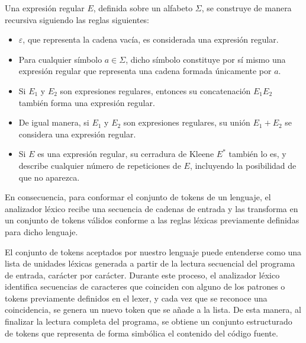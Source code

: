 \documentclass[a4paper,12pt]{article}
\begin{document}
\begin{tcolorbox}[title=Definición: Expresiones regulares]

Una expresión regular $E$, definida sobre un alfabeto $\Sigma$, se construye de manera recursiva siguiendo las reglas siguientes:

\begin{itemize}
    \item $\varepsilon$, que representa la cadena vacía, es considerada una expresión regular.
    
    \item Para cualquier símbolo $a \in \Sigma$, dicho símbolo constituye por sí mismo una expresión regular que representa una cadena formada únicamente por $a$.
    
    \item Si $E_1$ y $E_2$ son expresiones regulares, entonces su concatenación $E_1E_2$ también forma una expresión regular.
    
    \item De igual manera, si $E_1$ y $E_2$ son expresiones regulares, su unión $E_1 + E_2$ se considera una expresión regular.
    
    \item Si $E$ es una expresión regular, su cerradura de Kleene $E^{*}$ también lo es, y describe cualquier número de repeticiones de $E$, incluyendo la posibilidad de que no aparezca.\cite{UNAMTesis,LDPnota3,Mitchell}
\end{itemize}
\end{tcolorbox}

En consecuencia, para conformar el conjunto de tokens de un lenguaje, el analizador léxico recibe una secuencia de cadenas de entrada y las transforma en un conjunto de tokens válidos conforme a las reglas léxicas previamente definidas para dicho lenguaje.

El conjunto de tokens aceptados por nuestro lenguaje puede entenderse como una lista de unidades léxicas generada a partir de la lectura secuencial del programa de entrada, carácter por carácter.
Durante este proceso, el analizador léxico identifica secuencias de caracteres que coinciden con alguno de los patrones o tokens previamente definidos en el lexer, y cada vez que se reconoce una coincidencia, se genera un nuevo token que se añade a la lista.
De esta manera, al finalizar la lectura completa del programa, se obtiene un conjunto estructurado de tokens que representa de forma simbólica el contenido del código fuente.
\end{document}
